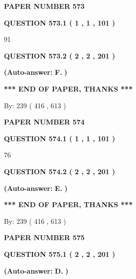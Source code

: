 \documentclass[12pt]{article}
\begin{document}
   
\newpage 
\setcounter{page}{ 
   573001 } 
   
   
 {\textbf{ \Large{ PAPER NUMBER  573  }}}
   
   
   
   
  
  
{\textbf{\large{QUESTION
573.1 
 ( 1 , 1 , 101 )
}}}

91
  
  
{\textbf{\large{QUESTION
573.2 
 ( 2 , 2 , 201 )
}}}
 
 
{\textbf{(Auto-answer:}}
{\textbf{\large{
F.}}}
{\textbf{)}}
 
 
   
   
   
   
\vspace{1.0in} 
{\textbf{\large{ *** END OF PAPER, THANKS *** }}} 
   
   
\hspace{1.0in} By: 
 239 ( 416 ,  613 )
   
   
   
   
\newpage 
\setcounter{page}{ 
   574001 } 
   
   
 {\textbf{ \Large{ PAPER NUMBER  574  }}}
   
   
   
   
  
  
{\textbf{\large{QUESTION
574.1 
 ( 1 , 1 , 101 )
}}}

76
  
  
{\textbf{\large{QUESTION
574.2 
 ( 2 , 2 , 201 )
}}}
 
 
{\textbf{(Auto-answer:}}
{\textbf{\large{
E.}}}
{\textbf{)}}
 
 
   
   
   
   
\vspace{1.0in} 
{\textbf{\large{ *** END OF PAPER, THANKS *** }}} 
   
   
\hspace{1.0in} By: 
 239 ( 416 ,  613 )
   
   
   
   
\newpage 
\setcounter{page}{ 
   575001 } 
   
   
 {\textbf{ \Large{ PAPER NUMBER  575  }}}
   
   
   
   
  
  
{\textbf{\large{QUESTION
575.1 
 ( 2 , 2 , 201 )
}}}
 
 
{\textbf{(Auto-answer:}}
{\textbf{\large{
D.}}}
{\textbf{)}}
 
 
  
\end{document}
